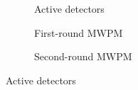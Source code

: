 \documentclass{article}
\begin{document}
\begin{figure}[ht]
    \centering
    \begin{subfigure}{0.31666666666666665\textwidth}
        \centering
        \resizebox{\textwidth}{!}{}
        \caption{Active detectors}
    \end{subfigure}
    \hfill
    \begin{subfigure}{0.31666666666666665\textwidth}
        \centering
        \resizebox{\textwidth}{!}{}
        \caption{First-round MWPM}
    \end{subfigure}
    \hfill
    \begin{subfigure}{0.31666666666666665\textwidth}
        \centering
        \resizebox{\textwidth}{!}{}
        \caption{Second-round MWPM}
    \end{subfigure}
    
    \vspace{0.5cm}
    \caption{Active detectors}
\end{figure}
\end{document}
